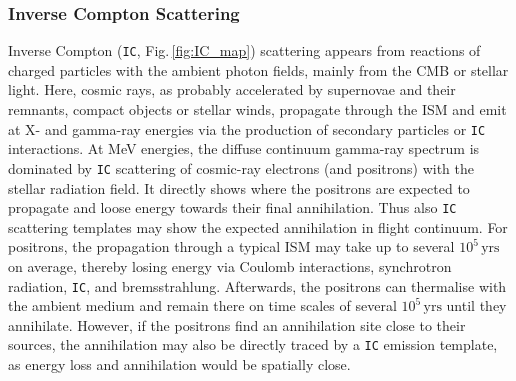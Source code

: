 \documentclass[doublespace,nopageskip]{VTthesis} %
\newcommand{\mrm}[1]{\mathrm{#1}}
\begin{document}
\subsubsection{Inverse Compton Scattering}

Inverse Compton (\texttt{IC}, Fig.\,\ref{fig:IC_map}) scattering appears from reactions of charged particles with the ambient photon fields, mainly from the CMB or stellar light.
%
Here, cosmic rays, as probably accelerated by supernovae and their remnants, compact objects or stellar winds, propagate through the ISM and emit at X- and gamma-ray energies via the production of secondary particles or \texttt{IC} interactions.
%
At MeV energies, the diffuse continuum gamma-ray spectrum is dominated by \texttt{IC} scattering of cosmic-ray electrons (and positrons) with the stellar radiation field.
%
It directly shows where the positrons are expected to propagate and loose energy towards their final annihilation.
%
Thus also \texttt{IC} scattering templates may show the expected annihilation in flight continuum.
%
For positrons, the propagation through a typical ISM may take up to several $10^5\,\mrm{yrs}$ on average, thereby losing energy via Coulomb interactions, synchrotron radiation, \texttt{IC}, and bremsstrahlung.
%
Afterwards, the positrons can thermalise with the ambient medium and remain there on time scales of several $10^{5}\,\mrm{yrs}$ until they annihilate.
%
However, if the positrons find an annihilation site close to their sources, the annihilation may also be directly traced by a \texttt{IC} emission template, as energy loss and annihilation would be spatially close.

\end{document}
